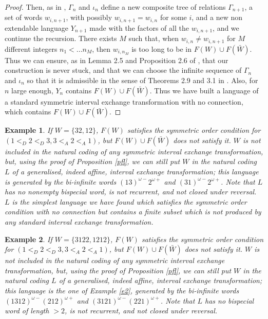 \documentclass[12pt,a4paper]{amsart}
\newtheorem{example}{Example}
\begin{document}
\begin{proof}
Then, as in \cite{fz1},  $\Gamma_n$ and $\iota_n$ define a new composite tree of relations $\Gamma_{n+1}$, a set of words $w_{i,n+1}$, with possibly $w_{i,n+1}=w_{i,n}$ for some $i$, and a new non extendable language $Y_{n+1}$ made with the factors of all the $w_{i,n+1}$, and we continue the recursion. There exists $M$ such that, when $w_{i,n} \neq w_{i,n+1}$ for  $M$ different integers $n_1<...  n_M$, then $w_{i,n_M}$ is too long to be  in $F(W)\cup F(\bar W)$. Thus we can ensure, as in Lemma 2.5 and Proposition 2.6 of \cite{fz1}, that our construction is never stuck, and that
we can  choose the infinite sequence of $\Gamma_n$ and $\iota_n$ so that it is admissible in the sense of Theorems 2.9 and 3.1 in \cite{fz1}. Also, for $n$ large enough, $Y_n$ contains $F(W)\cup F(\bar W)$.
Thus we have built a language of a standard symmetric interval exchange transformation with no connection, which contains $F(W)\cup F(\bar W)$. \end{proof}

\begin{example}\label{e5b} If $W=\{32, 12\}$, $F(W)$ satisfies the symmetric order condition for  $(1<_D 2<_D 3,3<_A 2<_A 1)$, but $F(W)\cup F(\bar W)$ does not satisfy it. $W$ is not included in the natural coding of any symmetric interval exchange transformation, but,  using the proof of Proposition \ref{pfl}, 
we can still put $W$ in
 the natural coding $L$ of a generalised, indeed affine, interval exchange transformation; this language is generated by the bi-infinite words  $(13)^{\omega-}2^{\omega+}$ and $(31)^{\omega-}2^{\omega+}$. Note that $L$   has no nonempty bispecial word, is 
 not recurrent, and not closed under reversal. $L$ is the simplest language we have found which satisfies the symmetric order condition with no connection but  contains a finite subset which  is not produced by any standard interval exchange transformation.  \end{example}

\begin{example}\label{e5} If $W=\{3122, 1212\}$, $F(W)$ satisfies the symmetric order condition for  $(1<_D 2<_D 3,3<_A 2<_A 1)$, but $F(W)\cup F(\bar W)$ does not satisfy it. $W$ is not included in the natural coding of any symmetric interval exchange transformation, but,  using the proof of Proposition \ref{pfl}, 
we can still put $W$ in
 the natural coding $L$ of a generalised, indeed affine, interval exchange transformation; this language is the one of Example \ref{e2},  generated by the bi-infinite words  $(1312)^{\omega-}(212)^{\omega+}$ and $(3121)^{\omega-}(221)^{\omega+}$. Note that $L$   has no bispecial word of length $>2$, is 
 not recurrent, and not closed under reversal.  \end{example}
 
\end{document}

